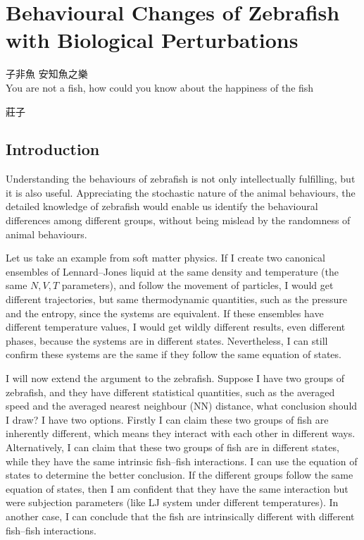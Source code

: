 \documentclass[11pt,twoside]{report}
\begin{document}
\chapter{Behavioural Changes of Zebrafish with Biological Perturbations}

\epigraph{子非魚\; 安知魚之樂\\[1ex]You are not a fish, how could you know about the happiness of the fish}{莊子}

\section{Introduction}

Understanding the behaviours of zebrafish is not only intellectually fulfilling, but it is also useful. Appreciating the stochastic nature of the animal behaviours, the detailed knowledge of zebrafish would enable us identify the behavioural differences among different groups, without being mislead by the randomness of animal behaviours.

Let us take an example from soft matter physics. If I create two canonical ensembles of Lennard--Jones liquid at the same density and temperature (the same $N, V, T$ parameters), and follow the movement of particles, I would get different trajectories, but same thermodynamic quantities, such as the pressure and the entropy, since the systems are equivalent. If these ensembles have different temperature values, I would get wildly different results, even different phases, because the systems are in different states. Nevertheless, I can still confirm these systems are the same if they follow the same equation of states.

I will now extend the argument to the zebrafish. Suppose I have two groups of zebrafish, and they have different statistical quantities, such as the averaged speed and the averaged nearest neighbour (NN) distance, what conclusion should I draw? I have two options. Firstly I can claim these two groups of fish are inherently different, which means they interact with each other in different ways. Alternatively, I can claim that these two groups of fish are in different states, while they have the same intrinsic fish--fish interactions. I can use the equation of states to determine the better conclusion. If the different groups follow the same equation of states, then I am confident that they have the same interaction but were subjection parameters (like LJ system under different temperatures). In another case, I can conclude that the fish are intrinsically different with different fish--fish interactions.
\end{document}
